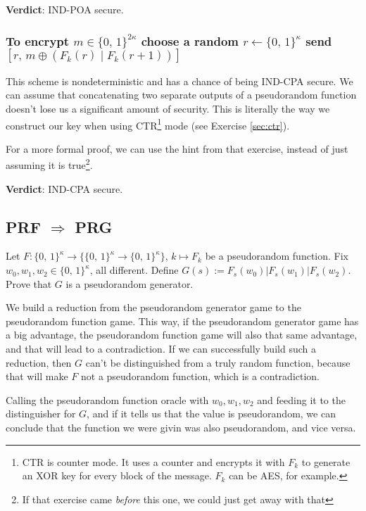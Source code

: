 \documentclass{article}
\begin{document}
  \textbf{Verdict}: IND-POA secure.

  \subsubsection{To encrypt $m \in \{0,\, 1\}^{2\kappa}$ choose a random $r \leftarrow \{0,\, 1\}^\kappa$ send $[r,\, m \oplus (F_k(r) \mid F_k(r + 1))]$}
  This scheme is nondeterministic and has a chance of being IND-CPA secure.
  We can assume that concatenating two separate outputs of a pseudorandom function doesn't lose us a significant amount of security.
  This is literally the way we construct our key when using CTR\footnote{CTR is counter mode. It uses a counter and encrypts it with $F_k$ to generate an XOR key for every block of the message. $F_k$ can be AES, for example.} mode (see Exercise \ref{sec:ctr}).

  For a more formal proof, we can use the hint from that exercise,
  instead of just assuming it is true\footnote{If that exercise came \textit{before} this one, we could just get away with that}.

  \textbf{Verdict}: IND-CPA secure.

  \subsection{PRF $\Rightarrow$ PRG}
  \begin{centerframebox}
    Let $F : \{0,\, 1\}^\kappa \to \{\{0,\, 1\}^\kappa \to \{0,\, 1\}^\kappa\}$, $k \mapsto F_k$
    be a pseudorandom function. Fix $w_0, w_1, w_2 \in \{0,\, 1\}^\kappa$, all different.
    Define $G(s) := F_s(w_0)|F_s(w_1)|F_s(w_2)$.
    Prove that $G$ is a pseudorandom generator.
  \end{centerframebox}
  We build a reduction from the pseudorandom generator game to the pseudorandom function game.
  This way, if the pseudorandom generator game has a big advantage,
  the pseudorandom function game will also that same advantage, and that will lead to a contradiction.
  If we can successfully build such a reduction,
  then $G$ can't be distinguished from a truly random function,
  because that will make $F$ not a pseudorandom function, which is a contradiction.

  Calling the pseudorandom function oracle with $w_0, w_1, w_2$ and feeding it to the distinguisher for $G$,
  and if it tells us that the value is pseudorandom,
  we can conclude that the function we were givin was also pseudorandom, and vice versa.
\end{document}
